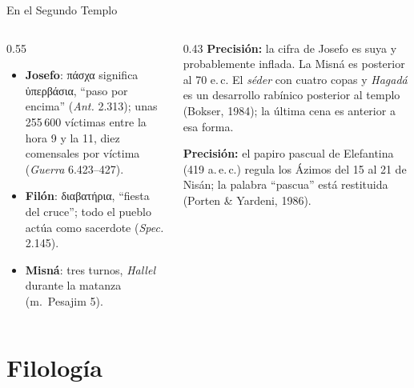\documentclass[hyperref={bookmarks=false},aspectratio=169]{beamer}
\newcommand{\grc}[1]{\foreignlanguage{ancientgreek}{#1}}
\newcommand{\precision}[1]{{\footnotesize\color{sepia}\textbf{Precisión:} #1}}
\begin{document}
\begin{frame}{En el Segundo Templo}
\begin{columns}[t,onlytextwidth]
\begin{column}{0.55\textwidth}\small
\begin{itemize}
\item \textbf{Josefo}: \grc{πάσχα} significa \grc{ὑπερβάσια}, ``paso por encima'' (\emph{Ant.} 2.313); unas 255\,600 víctimas entre la hora 9 y la 11, diez comensales por víctima (\emph{Guerra} 6.423--427).
\item \textbf{Filón}: \grc{διαβατήρια}, ``fiesta del cruce''; todo el pueblo actúa como sacerdote (\emph{Spec.} 2.145).
\item \textbf{Misná}: tres turnos, \emph{Hallel} durante la matanza (m.~Pesajim 5).
\end{itemize}
\end{column}
\begin{column}{0.43\textwidth}
\precision{la cifra de Josefo es suya y probablemente inflada. La Misná es posterior al 70 e.\,c. El \emph{séder} con cuatro copas y \emph{Hagadá} es un desarrollo rabínico posterior al templo (Bokser, 1984); la última cena es anterior a esa forma.}\par\medskip
\precision{el papiro pascual de Elefantina (419 a.\,e.\,c.) regula los Ázimos del 15 al 21 de Nisán; la palabra ``pascua'' está restituida (Porten \& Yardeni, 1986).}
\end{column}
\end{columns}
\end{frame}

\section{Filología}
\end{document}
